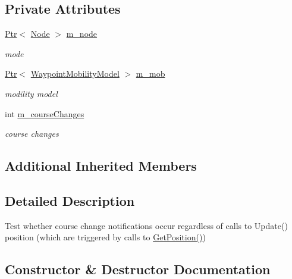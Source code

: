 \subsection*{Private Attributes}
\begin{DoxyCompactItemize}
\item 
\hyperlink{classns3_1_1Ptr}{Ptr}$<$ \hyperlink{classns3_1_1Node}{Node} $>$ \hyperlink{classWaypointLazyNotifyFalse_a979dbe1c5694a1983f588550429d2159}{m\+\_\+node}
\begin{DoxyCompactList}\small\item\em mode \end{DoxyCompactList}\item 
\hyperlink{classns3_1_1Ptr}{Ptr}$<$ \hyperlink{classns3_1_1WaypointMobilityModel}{Waypoint\+Mobility\+Model} $>$ \hyperlink{classWaypointLazyNotifyFalse_acf8bb7f07cba4da3d83bab7bcc97094a}{m\+\_\+mob}
\begin{DoxyCompactList}\small\item\em modility model \end{DoxyCompactList}\item 
int \hyperlink{classWaypointLazyNotifyFalse_a78f52b3733698debc6d133982de7ea56}{m\+\_\+course\+Changes}
\begin{DoxyCompactList}\small\item\em course changes \end{DoxyCompactList}\end{DoxyCompactItemize}
\subsection*{Additional Inherited Members}


\subsection{Detailed Description}
Test whether course change notifications occur regardless of calls to Update() position (which are triggered by calls to \hyperlink{lena-cqi-threshold_8cc_acebf763e1a0478cec225f9547941ae54}{Get\+Position()}) 

\subsection{Constructor \& Destructor Documentation}
